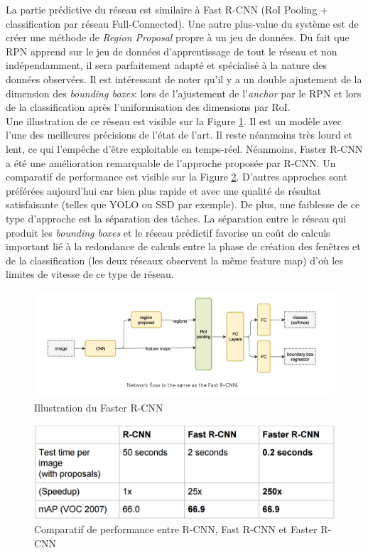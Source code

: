 \noindent La partie prédictive du réseau est similaire à Fast R-CNN (RoI Pooling + classification par réseau Full-Connected). Une autre plus-value du système est de créer une méthode de \textit{Region Proposal} propre à un jeu de données. Du fait que RPN apprend sur le jeu de données d'apprentissage de tout le réseau et non indépendamment, il sera parfaitement adapté et spécialisé à la nature des données observées. Il est intéressant de noter qu'il y a un double ajustement de la dimension des \textit{ bounding boxes}: lors de l'ajustement de l'\textit{anchor} par le RPN et lors de la classification après l'uniformisation des dimensions par RoI.\\

\noindent Une illustration de ce réseau est visible sur la Figure \ref{faster}. Il est un modèle avec l'une des meilleures précisions de l'état de l'art. Il reste néanmoins très lourd et lent, ce qui l'empêche d'être exploitable en temps-réel. Néanmoins, Faster R-CNN a été une amélioration remarquable de l'approche proposée par R-CNN. Un comparatif de performance est visible sur la Figure \ref{compfaster}. D'autres approches sont préférées aujourd'hui car bien plus rapide et avec une qualité de résultat satisfaisante (telles que YOLO ou SSD par exemple). De plus, une faiblesse de ce type d'approche est la séparation des tâches. La séparation entre le réseau qui produit les \textit{bounding boxes} et le réseau prédictif favorise un coût de calculs important lié à la redondance de calculs entre la phase de création des fenêtres et de la classification (les deux réseaux observent la même feature map) d'où les limites de vitesse de ce type de réseau.

\begin{figure}
    \centering
    \includegraphics[scale=0.4]{./tex/computer-vision/sota/rpn.png}
    \caption{Illustration du Faster R-CNN}
    \label{faster}
\end{figure}

\begin{figure}
    \centering
    \includegraphics[scale=0.3]{./tex/computer-vision/sota/fas12.png}
    \caption{Comparatif de performance entre R-CNN, Fast R-CNN et Faster R-CNN}
    \label{compfaster}
\end{figure}

